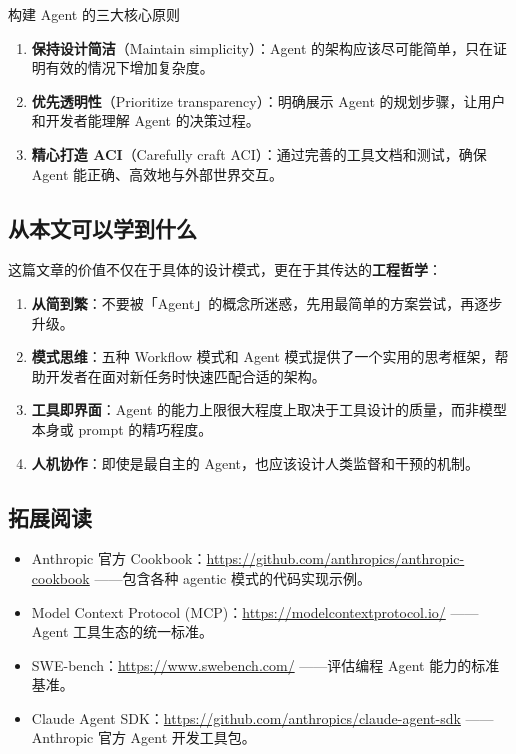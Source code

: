 \documentclass[a4paper]{article}
\begin{document}
\begin{importantbox}{构建 Agent 的三大核心原则}
\begin{enumerate}
    \item \textbf{保持设计简洁}（Maintain simplicity）：Agent 的架构应该尽可能简单，只在证明有效的情况下增加复杂度。
    \item \textbf{优先透明性}（Prioritize transparency）：明确展示 Agent 的规划步骤，让用户和开发者能理解 Agent 的决策过程。
    \item \textbf{精心打造 ACI}（Carefully craft ACI）：通过完善的工具文档和测试，确保 Agent 能正确、高效地与外部世界交互。
\end{enumerate}
\end{importantbox}

\subsection{从本文可以学到什么}

这篇文章的价值不仅在于具体的设计模式，更在于其传达的\textbf{工程哲学}：

\begin{enumerate}
    \item \textbf{从简到繁}：不要被「Agent」的概念所迷惑，先用最简单的方案尝试，再逐步升级。
    \item \textbf{模式思维}：五种 Workflow 模式和 Agent 模式提供了一个实用的思考框架，帮助开发者在面对新任务时快速匹配合适的架构。
    \item \textbf{工具即界面}：Agent 的能力上限很大程度上取决于工具设计的质量，而非模型本身或 prompt 的精巧程度。
    \item \textbf{人机协作}：即使是最自主的 Agent，也应该设计人类监督和干预的机制。
\end{enumerate}

\subsection{拓展阅读}

\begin{itemize}
    \item Anthropic 官方 Cookbook：\url{https://github.com/anthropics/anthropic-cookbook} ——包含各种 agentic 模式的代码实现示例。
    \item Model Context Protocol (MCP)：\url{https://modelcontextprotocol.io/} ——Agent 工具生态的统一标准。
    \item SWE-bench：\url{https://www.swebench.com/} ——评估编程 Agent 能力的标准基准。
    \item Claude Agent SDK：\url{https://github.com/anthropics/claude-agent-sdk} ——Anthropic 官方 Agent 开发工具包。
\end{itemize}

\end{document}
